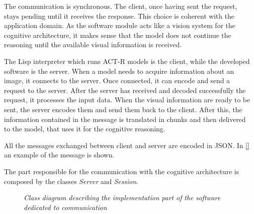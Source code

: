 		The communication is synchronous. 
		The client, once having sent the request, stays pending until it receives the response. 
		This choice is coherent with the application domain. 
		As the software module acts like a vision system for the cognitive architecture, it makes sense that the model does not continue the reasoning until the available visual information is received.

		The \mbox{Lisp} interpreter which runs \mbox{ACT-R} models is the client, while the developed software is the server.  	
		When a model needs to acquire information about an image, it connects to the server. 
		Once connected, it can encode and send a request to the server. 
		After the server has received and decoded successfully the request, it processes the input data. When the visual information are ready to be sent, the server encodes them and send them back to the client. 
		After this, the information contained in the message is translated in chunks and then delivered to the model, that uses it for the cognitive reasoning.

		All the messages exchanged between client and server are encoded in \mbox{JSON}. 
		In \ref{} an example of the message is shown.


		The part responsible for the communication with the cognitive architecture is composed by the classes \emph{Server} and \emph{Session}. 

		\begin{figure}[h]
		  \begin{center} 
		  \end{center} 
		  \caption{\textit{Class diagram describing the implementation part of the software dedicated to communication}}  
		  \label{fig:impl_feat_extraction}
	 	\end{figure}	



